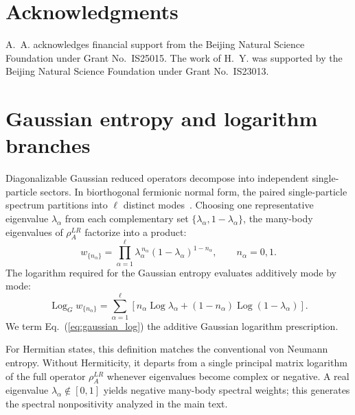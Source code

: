 \documentclass[aps,prb,reprint,superscriptaddress,amsmath,amssymb,floatfix]{revtex4-2}
\begin{document}
\section*{Acknowledgments}

A.~A. acknowledges financial support from the Beijing Natural Science
Foundation under Grant No.~IS25015.
The work of H.~Y. was supported by the Beijing Natural Science Foundation
under Grant No.~IS23013.


\appendix

\section{Gaussian entropy and logarithm branches}
\label{app:entropy_branches}

  Diagonalizable Gaussian reduced operators decompose into independent single-particle sectors. In biorthogonal fermionic normal form, the paired single-particle spectrum partitions into $\ell$ distinct modes~\cite{PeschelEisler2009,Herviou2019,Guo2021}. Choosing one representative eigenvalue $\lambda_\alpha$ from each complementary set $\{\lambda_\alpha, 1-\lambda_\alpha\}$, the many-body eigenvalues of $\rho_A^{LR}$ factorize into a product:
\begin{equation}
w_{\{n_\alpha\}}
=
\prod_{\alpha=1}^{\ell}
\lambda_\alpha^{\,n_\alpha}
(1-\lambda_\alpha)^{1-n_\alpha},
\qquad
n_\alpha=0,1.
\label{eq:manybody_gaussian_weights}
\end{equation}
The logarithm required for the Gaussian entropy evaluates additively mode by mode:
\begin{equation}
\operatorname{Log}_{G} w_{\{n_\alpha\}}
=
\sum_{\alpha=1}^{\ell}
\left[
n_\alpha\operatorname{Log}\lambda_\alpha
+
(1-n_\alpha)\operatorname{Log}(1-\lambda_\alpha)
\right].
\label{eq:gaussian_log}
\end{equation}
We term Eq.~(\ref{eq:gaussian_log}) the additive Gaussian logarithm prescription.

For Hermitian states, this definition matches the conventional von Neumann entropy. Without Hermiticity, it departs from a single principal matrix logarithm of the full operator $\rho_A^{LR}$ whenever eigenvalues become complex or negative. A real eigenvalue $\lambda_\alpha\notin[0,1]$ yields negative many-body spectral weights; this generates the spectral nonpositivity analyzed in the main text.
\end{document}
